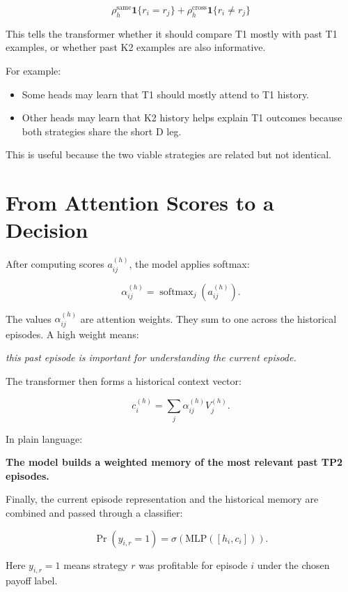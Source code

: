 \documentclass[11pt]{article}
\newcommand{\softmax}{\operatorname{softmax}}
\newcommand{\1}{\mathbf{1}}
\begin{document}
\[
  \rho_h^{\mathrm{same}}\1\{r_i=r_j\}
  +
  \rho_h^{\mathrm{cross}}\1\{r_i\neq r_j\}
\]

This tells the transformer whether it should compare T1 mostly with past T1
examples, or whether past K2 examples are also informative.

For example:

\begin{itemize}[leftmargin=*]
  \item Some heads may learn that T1 should mostly attend to T1 history.
  \item Other heads may learn that K2 history helps explain T1 outcomes because
        both strategies share the short D leg.
\end{itemize}

This is useful because the two viable strategies are related but not identical.

\section{From Attention Scores to a Decision}

After computing scores \(a_{ij}^{(h)}\), the model applies softmax:

\[
  \alpha_{ij}^{(h)}
  =
  \softmax_j(a_{ij}^{(h)}).
\]

The values \(\alpha_{ij}^{(h)}\) are attention weights. They sum to one across
the historical episodes. A high weight means:

\begin{center}
\textit{this past episode is important for understanding the current episode.}
\end{center}

The transformer then forms a historical context vector:

\[
  c_i^{(h)} = \sum_j \alpha_{ij}^{(h)} V_j^{(h)}.
\]

In plain language:

\begin{center}
\textbf{The model builds a weighted memory of the most relevant past TP2
episodes.}
\end{center}

Finally, the current episode representation and the historical memory are
combined and passed through a classifier:

\[
  \Pr(y_{i,r}=1)
  =
  \sigma(\mathrm{MLP}([h_i,c_i])).
\]

Here \(y_{i,r}=1\) means strategy \(r\) was profitable for episode \(i\) under
the chosen payoff label.
\end{document}

